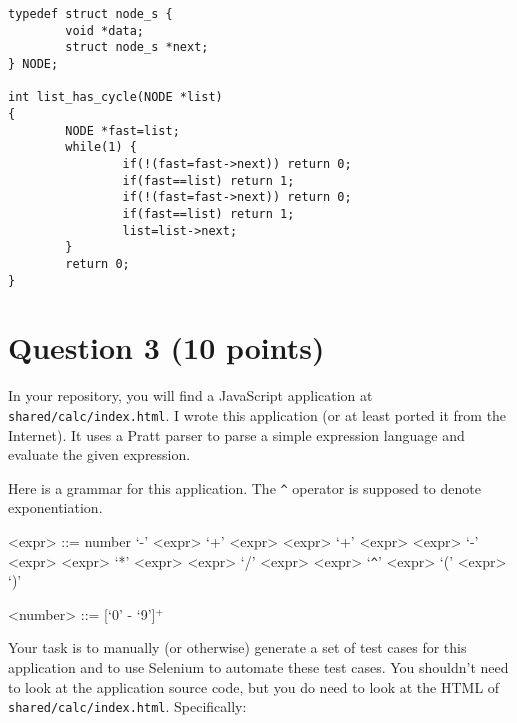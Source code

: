 \documentclass[10pt,hidelinks]{article}
\begin{document}
\begin{lstlisting}
typedef struct node_s {
        void *data;
        struct node_s *next;
} NODE;

int list_has_cycle(NODE *list)
{
        NODE *fast=list;
        while(1) {
                if(!(fast=fast->next)) return 0;
                if(fast==list) return 1;
                if(!(fast=fast->next)) return 0;
                if(fast==list) return 1;
                list=list->next;
        }
        return 0;
}
\end{lstlisting}

\section*{Question 3 (10 points)}

In your repository, you will find a JavaScript application at {\tt
  shared/calc/index.html}. I wrote this application (or at least
ported it from the Internet). It uses a Pratt parser to parse a simple expression language and evaluate the given expression.

Here is a grammar for this application. The \verb+^+ operator is supposed to denote
exponentiation.

\begin{center}
\begin{minipage}{3in}
\begin{grammar}
  <expr> ::= number 
         \alt `-' <expr>
         \alt `+' <expr>
         \alt  <expr> `+' <expr> \alt  <expr> `-' <expr>
         \alt  <expr> `*' <expr> \alt  <expr> `/' <expr>
         \alt  <expr> `\verb+^+' <expr>
         \alt `(' <expr> `)'
         
  <number> ::= [`0' - `9']$^+$
\end{grammar}
\end{minipage}
\end{center}

Your task is to manually (or otherwise) generate a set of test cases
for this application and to use Selenium to automate these test
cases. You shouldn't need to look at the application source
code, but you do need to look at the HTML of {\tt shared/calc/index.html}. Specifically:
\end{document}
